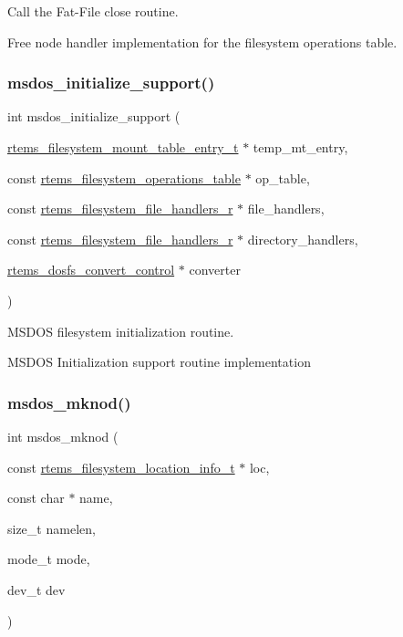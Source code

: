 Call the Fat-\/\+File close routine. 

Free node handler implementation for the filesystem operations table. \mbox{\label{group__libfs__msdos_gab03ef344fdc3a391eea940b6fdd9da24}} 
\subsubsection{\texorpdfstring{msdos\_initialize\_support()}{msdos\_initialize\_support()}}
{\footnotesize\ttfamily int msdos\+\_\+initialize\+\_\+support (\begin{DoxyParamCaption}\item[{\mbox{\hyperlink{structrtems__filesystem__mount__table__entry__tt}{rtems\+\_\+filesystem\+\_\+mount\+\_\+table\+\_\+entry\+\_\+t}} $\ast$}]{temp\+\_\+mt\+\_\+entry,  }\item[{const \mbox{\hyperlink{struct__rtems__filesystem__operations__table}{rtems\+\_\+filesystem\+\_\+operations\+\_\+table}} $\ast$}]{op\+\_\+table,  }\item[{const \mbox{\hyperlink{struct__rtems__filesystem__file__handlers__r}{rtems\+\_\+filesystem\+\_\+file\+\_\+handlers\+\_\+r}} $\ast$}]{file\+\_\+handlers,  }\item[{const \mbox{\hyperlink{struct__rtems__filesystem__file__handlers__r}{rtems\+\_\+filesystem\+\_\+file\+\_\+handlers\+\_\+r}} $\ast$}]{directory\+\_\+handlers,  }\item[{\mbox{\hyperlink{structrtems__dosfs__convert__control}{rtems\+\_\+dosfs\+\_\+convert\+\_\+control}} $\ast$}]{converter }\end{DoxyParamCaption})}



M\+S\+D\+OS filesystem initialization routine. 

M\+S\+D\+OS Initialization support routine implementation \mbox{\label{group__libfs__msdos_gad2d321f559fc408da551e9b13adb5241}} 
\subsubsection{\texorpdfstring{msdos\_mknod()}{msdos\_mknod()}}
{\footnotesize\ttfamily int msdos\+\_\+mknod (\begin{DoxyParamCaption}\item[{const \mbox{\hyperlink{group__LibIO_ga3252b3d31ee3c49ffff0b7604a676864}{rtems\+\_\+filesystem\+\_\+location\+\_\+info\+\_\+t}} $\ast$}]{loc,  }\item[{const char $\ast$}]{name,  }\item[{size\+\_\+t}]{namelen,  }\item[{mode\+\_\+t}]{mode,  }\item[{dev\+\_\+t}]{dev }\end{DoxyParamCaption})}



